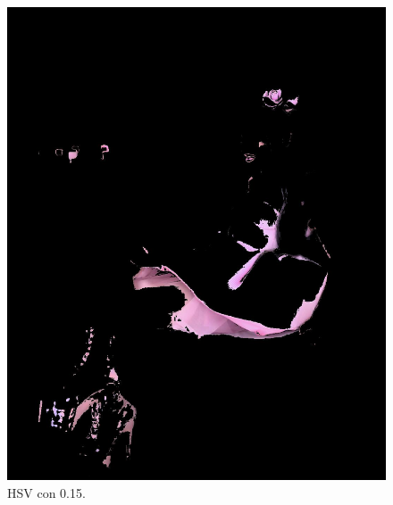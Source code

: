 \documentclass[11pt, letterpaper]{article}
\begin{document}
\begin{figure}[h!]
	\begin{minipage}{0.4\textwidth}
		\centering
		\includegraphics[width=\textwidth]{IMG/R13.jpg}
		\caption*{HSV con 0.15.}
	\end{minipage}\hfill
	\begin{minipage}{0.4\textwidth}
		\centering

\end{minipage}
\end{figure}
\end{document}
